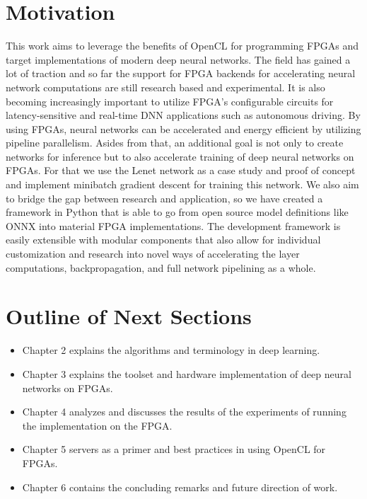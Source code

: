 \section{Motivation}

This work aims to leverage the benefits of OpenCL for programming FPGAs and target implementations of modern deep neural networks. The field has gained a lot of traction and so far the support for FPGA backends for accelerating neural network computations are still research based and experimental. It is also becoming increasingly important to utilize FPGA's configurable circuits for latency-sensitive and real-time DNN applications such as autonomous driving. By using FPGAs, neural networks can be accelerated and energy efficient by utilizing pipeline parallelism. Asides from that, an additional goal is not only to create networks for inference but to also accelerate training of deep neural networks on FPGAs. For that we use the Lenet network as a case study and proof of concept and implement minibatch gradient descent for training this network. We also aim to bridge the gap between research and application, so we have created a framework in Python that is able to go from open source model definitions like ONNX into material FPGA implementations. The development framework is easily extensible with modular components that also allow for individual customization and research into novel ways of accelerating the layer computations, backpropagation, and full network pipelining as a whole. 


\section{Outline of Next Sections}

\begin{itemize}

\item Chapter 2 explains the algorithms and terminology in deep learning. 

\item Chapter 3 explains the toolset and hardware implementation of deep neural networks on FPGAs.

\item Chapter 4 analyzes and discusses the results of the experiments of running the implementation on the FPGA.

\item Chapter 5 servers as a primer and best practices in using OpenCL for FPGAs.

\item Chapter 6 contains the concluding remarks and future direction of work.

\end{itemize}



